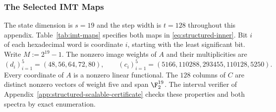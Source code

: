 \subsubsection{The Selected IMT Maps}

The state dimension is $s=19$ and the step width is $t=128$ throughout this
appendix. Table~\ref{tab:imt-maps} specifies both maps in
\eqref{eq:structured-inner}. Bit $i$ of each hexadecimal word is coordinate
$i$, starting with the least significant bit. Write $M:=2^{19}-1$.
The nonzero image weights of $A$ and their multiplicities are
\[
 (d_i)_{i=1}^5=(48,56,64,72,80),\qquad
 (c_i)_{i=1}^5=(5166,110288,293455,110128,5250).
\]
Every coordinate of $A$ is a nonzero linear functional. The $128$ columns
of $C$ are distinct nonzero vectors of weight five and span $\F_2^{19}$.
The interval verifier of Appendix~\ref{app:structured-scalable-certificate}
checks these properties and both spectra by exact enumeration.

